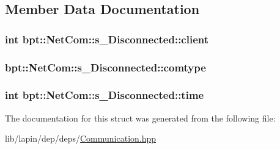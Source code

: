 \subsection{Member Data Documentation}
\hypertarget{structbpt_1_1_net_com_1_1s___disconnected_a38c6c2c5802d5125b6d83f193fdf676e}{
\subsubsection[{client}]{ {\bf int} bpt\-::\-Net\-Com\-::s\-\_\-\-Disconnected\-::client}}\label{structbpt_1_1_net_com_1_1s___disconnected_a38c6c2c5802d5125b6d83f193fdf676e}
\hypertarget{structbpt_1_1_net_com_1_1s___disconnected_ab5e8c45cb8f6efc24653fe5ccd1cee0d}{
\subsubsection[{comtype}]{ bpt\-::\-Net\-Com\-::s\-\_\-\-Disconnected\-::comtype}}\label{structbpt_1_1_net_com_1_1s___disconnected_ab5e8c45cb8f6efc24653fe5ccd1cee0d}
\hypertarget{structbpt_1_1_net_com_1_1s___disconnected_add20b8bfdd135d31b868ff99351a3816}{
\subsubsection[{time}]{ {\bf int} bpt\-::\-Net\-Com\-::s\-\_\-\-Disconnected\-::time}}\label{structbpt_1_1_net_com_1_1s___disconnected_add20b8bfdd135d31b868ff99351a3816}


The documentation for this struct was generated from the following file\-:\begin{DoxyCompactItemize}
\item 
lib/lapin/dep/deps/\hyperlink{_communication_8hpp}{Communication.\-hpp}\end{DoxyCompactItemize}
